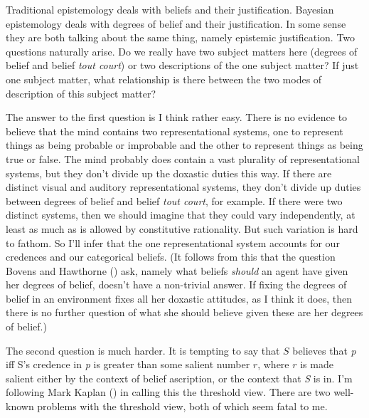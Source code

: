 \documentclass[
  11pt,
  letterpaper,
  DIV=11,
  numbers=noendperiod,
  oneside]{scrartcl}
\begin{document}
Traditional epistemology deals with beliefs and their justification.
Bayesian epistemology deals with degrees of belief and their
justification. In some sense they are both talking about the same thing,
namely epistemic justification. Two questions naturally arise. Do we
really have two subject matters here (degrees of belief and belief
\emph{tout court}) or two descriptions of the one subject matter? If
just one subject matter, what relationship is there between the two
modes of description of this subject matter?

The answer to the first question is I think rather easy. There is no
evidence to believe that the mind contains two representational systems,
one to represent things as being probable or improbable and the other to
represent things as being true or false. The mind probably does contain
a vast plurality of representational systems, but they don't divide up
the doxastic duties this way. If there are distinct visual and auditory
representational systems, they don't divide up duties between degrees of
belief and belief \emph{tout court}, for example. If there were two
distinct systems, then we should imagine that they could vary
independently, at least as much as is allowed by constitutive
rationality. But such variation is hard to fathom. So I'll infer that
the one representational system accounts for our credences and our
categorical beliefs. (It follows from this that the question Bovens and
Hawthorne () ask, namely what beliefs
\emph{should} an agent have given her degrees of belief, doesn't have a
non-trivial answer. If fixing the degrees of belief in an environment
fixes all her doxastic attitudes, as I think it does, then there is no
further question of what she should believe given these are her degrees
of belief.)

The second question is much harder. It is tempting to say that \(S\)
believes that \emph{p} iff S's credence in \emph{p} is greater than some
salient number \(r\), where \(r\) is made salient either by the context
of belief ascription, or the context that \emph{S} is in. I'm following
Mark Kaplan () in calling this the
threshold view. There are two well-known problems with the threshold
view, both of which seem fatal to me.
\end{document}
